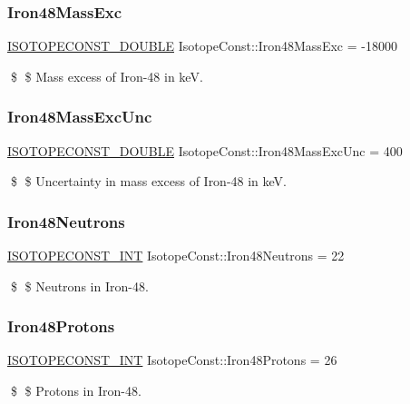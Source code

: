 \subsubsection{\texorpdfstring{Iron48\+Mass\+Exc}{Iron48MassExc}}
{\footnotesize\ttfamily \mbox{\hyperlink{group___isotope_const-_macros_ga8f45a7272ce02c0b4c65c44636ed719a}{I\+S\+O\+T\+O\+P\+E\+C\+O\+N\+S\+T\+\_\+\+D\+O\+U\+B\+LE}} Isotope\+Const\+::\+Iron48\+Mass\+Exc = -\/18000}

\$ \$ Mass excess of Iron-\/48 in keV. \mbox{\label{group___isotope_const-_iron-_fe48_gaa3d845f230318fad5f67686d7c24c8c3}} 
\subsubsection{\texorpdfstring{Iron48\+Mass\+Exc\+Unc}{Iron48MassExcUnc}}
{\footnotesize\ttfamily \mbox{\hyperlink{group___isotope_const-_macros_ga8f45a7272ce02c0b4c65c44636ed719a}{I\+S\+O\+T\+O\+P\+E\+C\+O\+N\+S\+T\+\_\+\+D\+O\+U\+B\+LE}} Isotope\+Const\+::\+Iron48\+Mass\+Exc\+Unc = 400}

\$ \$ Uncertainty in mass excess of Iron-\/48 in keV. \mbox{\label{group___isotope_const-_iron-_fe48_ga51e6b032d83b2d53ef4a08222dc8433f}} 
\subsubsection{\texorpdfstring{Iron48\+Neutrons}{Iron48Neutrons}}
{\footnotesize\ttfamily \mbox{\hyperlink{group___isotope_const-_macros_ga5f18360b3e99483a35c32d789e62621c}{I\+S\+O\+T\+O\+P\+E\+C\+O\+N\+S\+T\+\_\+\+I\+NT}} Isotope\+Const\+::\+Iron48\+Neutrons = 22}

\$ \$ Neutrons in Iron-\/48. \mbox{\label{group___isotope_const-_iron-_fe48_gacc67ef63a0b77434f2b5e8c942444899}} 
\subsubsection{\texorpdfstring{Iron48\+Protons}{Iron48Protons}}
{\footnotesize\ttfamily \mbox{\hyperlink{group___isotope_const-_macros_ga5f18360b3e99483a35c32d789e62621c}{I\+S\+O\+T\+O\+P\+E\+C\+O\+N\+S\+T\+\_\+\+I\+NT}} Isotope\+Const\+::\+Iron48\+Protons = 26}

\$ \$ Protons in Iron-\/48. 